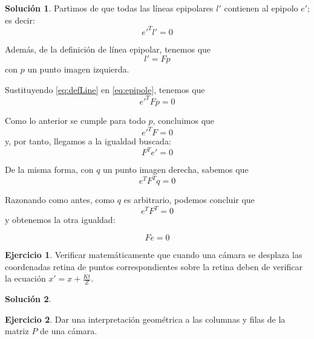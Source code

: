 \documentclass[a4paper, 11pt]{article}
\theoremstyle{definition}
\newtheorem{ejercicio}{Ejercicio}
\newtheorem*{solucion}{Solución}
\theoremstyle{theorem}
\begin{document}
    \begin{solucion}
        Partimos de que todas las líneas epipolares $l'$ contienen al epipolo $e'$; es decir:
        \begin{equation}
            e'^Tl' = 0
            \label{eq:epipole}
        \end{equation}

        Además, de la definición de línea epipolar, tenemos que
        \begin{equation}
            l' = Fp
            \label{eq:defLine}
        \end{equation}
        con $p$ un punto imagen izquierda.

        Sustituyendo \ref{eq:defLine} en \ref{eq:epipole}, tenemos que
        \[
            e'^TFp = 0
        \]

        Como lo anterior se cumple para todo $p$, concluimos que
        \[
            e'^TF = 0
        \]
        y, por tanto, llegamos a la igualdad buscada:
        \[
            F^T e' = 0
        \]

        De la misma forma, con $q$ un punto imagen derecha, sabemos que
        \[
            e^T F^T q = 0
        \]

        Razonando como antes, como $q$ es arbitrario, podemos concluir que
        \[
            e^T F^T = 0
        \]
        y obtenemos la otra igualdad:

        \[
            F e = 0
        \]


    \end{solucion}

    \begin{ejercicio}
        Verificar matemáticamente que cuando una cámara se desplaza las coordenadas retina de puntos correspondientes sobre la retina deben de verificar la ecuación $x'= x + \frac{Kt}{Z}$.
    \end{ejercicio}

    \begin{solucion}

    \end{solucion}

    \begin{ejercicio}
        Dar una interpretación geométrica a las columnas y filas de la matriz $P$ de una cámara.
    \end{ejercicio}
\end{document}
